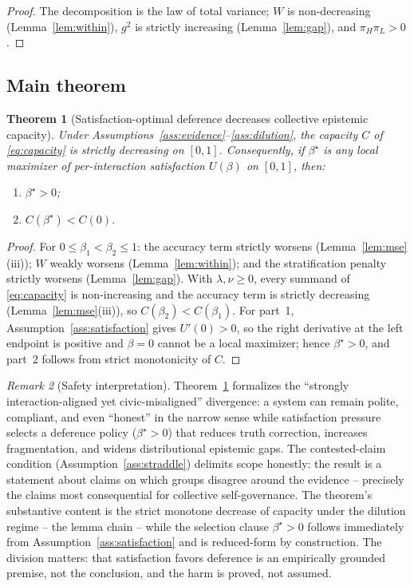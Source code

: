 \documentclass[11pt]{article}
\newtheorem{theorem}{Theorem}[section]
\theoremstyle{definition}
\theoremstyle{remark}
\newtheorem{remark}[theorem]{Remark}
\numberwithin{equation}{section}
\begin{document}
\begin{proof}
The decomposition is the law of total variance; $W$ is non-decreasing (Lemma~\ref{lem:within}), $g^2$ is strictly increasing (Lemma~\ref{lem:gap}), and $\pi_H \pi_L > 0$.
\end{proof}

\subsection{Main theorem}\label{sec:theorem}

\begin{theorem}[Satisfaction-optimal deference decreases collective epistemic capacity]\label{thm:main}
Under Assumptions~\ref{ass:evidence}--\ref{ass:dilution}, the capacity $C$ of \eqref{eq:capacity} is strictly decreasing on $[0,1]$. Consequently, if $\beta^\star$ is any local maximizer of per-interaction satisfaction $U(\beta)$ on $[0,1]$, then:
\begin{enumerate}
  \item $\beta^\star > 0$;
  \item $C(\beta^\star) < C(0)$.
\end{enumerate}
\end{theorem}

\begin{proof}
For $0 \le \beta_1 < \beta_2 \le 1$: the accuracy term strictly worsens (Lemma~\ref{lem:mse}(iii)); $W$ weakly worsens (Lemma~\ref{lem:within}); and the stratification penalty strictly worsens (Lemma~\ref{lem:gap}). With $\lambda, \nu \ge 0$, every summand of \eqref{eq:capacity} is non-increasing and the accuracy term is strictly decreasing (Lemma~\ref{lem:mse}(iii)), so $C(\beta_2) < C(\beta_1)$. For part~1, Assumption~\ref{ass:satisfaction} gives $U'(0) > 0$, so the right derivative at the left endpoint is positive and $\beta = 0$ cannot be a local maximizer; hence $\beta^\star > 0$, and part~2 follows from strict monotonicity of $C$.
\end{proof}

\begin{remark}[Safety interpretation]\label{rem:safety}
Theorem~\ref{thm:main} formalizes the ``strongly interaction-aligned yet civic-misaligned'' divergence: a system can remain polite, compliant, and even ``honest'' in the narrow sense while satisfaction pressure selects a deference policy ($\beta^\star > 0$) that reduces truth correction, increases fragmentation, and widens distributional epistemic gaps. The contested-claim condition (Assumption~\ref{ass:straddle}) delimits scope honestly: the result is a statement about claims on which groups disagree around the evidence -- precisely the claims most consequential for collective self-governance. The theorem's substantive content is the strict monotone decrease of capacity under the dilution regime -- the lemma chain -- while the selection clause $\beta^\star > 0$ follows immediately from Assumption~\ref{ass:satisfaction} and is reduced-form by construction. The division matters: that satisfaction favors deference is an empirically grounded premise, not the conclusion, and the harm is proved, not assumed.
\end{remark}
\end{document}
